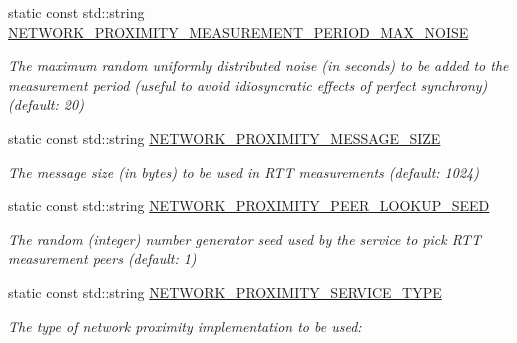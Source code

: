 \begin{DoxyCompactItemize}
static const std\+::string \hyperlink{classwrench_1_1_network_proximity_service_property_a4a8f7599edf8a3983a0ff5ddfa3c8e2e}{N\+E\+T\+W\+O\+R\+K\+\_\+\+P\+R\+O\+X\+I\+M\+I\+T\+Y\+\_\+\+M\+E\+A\+S\+U\+R\+E\+M\+E\+N\+T\+\_\+\+P\+E\+R\+I\+O\+D\+\_\+\+M\+A\+X\+\_\+\+N\+O\+I\+SE}
\begin{DoxyCompactList}\small\item\em The maximum random uniformly distributed noise (in seconds) to be added to the measurement period (useful to avoid idiosyncratic effects of perfect synchrony) (default\+: 20) \end{DoxyCompactList}\item 
\mbox{\label{classwrench_1_1_network_proximity_service_property_ad29e681b572ce963991844a75794e4c2}} 
static const std\+::string \hyperlink{classwrench_1_1_network_proximity_service_property_ad29e681b572ce963991844a75794e4c2}{N\+E\+T\+W\+O\+R\+K\+\_\+\+P\+R\+O\+X\+I\+M\+I\+T\+Y\+\_\+\+M\+E\+S\+S\+A\+G\+E\+\_\+\+S\+I\+ZE}
\begin{DoxyCompactList}\small\item\em The message size (in bytes) to be used in R\+TT measurements (default\+: 1024) \end{DoxyCompactList}\item 
\mbox{\label{classwrench_1_1_network_proximity_service_property_a1c62b6bc5aef9b415d583aff4d44a892}} 
static const std\+::string \hyperlink{classwrench_1_1_network_proximity_service_property_a1c62b6bc5aef9b415d583aff4d44a892}{N\+E\+T\+W\+O\+R\+K\+\_\+\+P\+R\+O\+X\+I\+M\+I\+T\+Y\+\_\+\+P\+E\+E\+R\+\_\+\+L\+O\+O\+K\+U\+P\+\_\+\+S\+E\+ED}
\begin{DoxyCompactList}\small\item\em The random (integer) number generator seed used by the service to pick R\+TT measurement peers (default\+: 1) \end{DoxyCompactList}\item 
static const std\+::string \hyperlink{classwrench_1_1_network_proximity_service_property_a4cb766dcd609012ab68000cfd9dc11b1}{N\+E\+T\+W\+O\+R\+K\+\_\+\+P\+R\+O\+X\+I\+M\+I\+T\+Y\+\_\+\+S\+E\+R\+V\+I\+C\+E\+\_\+\+T\+Y\+PE}
\begin{DoxyCompactList}\small\item\em The type of network proximity implementation to be used\+: \end{DoxyCompactList}\end{DoxyCompactItemize}


